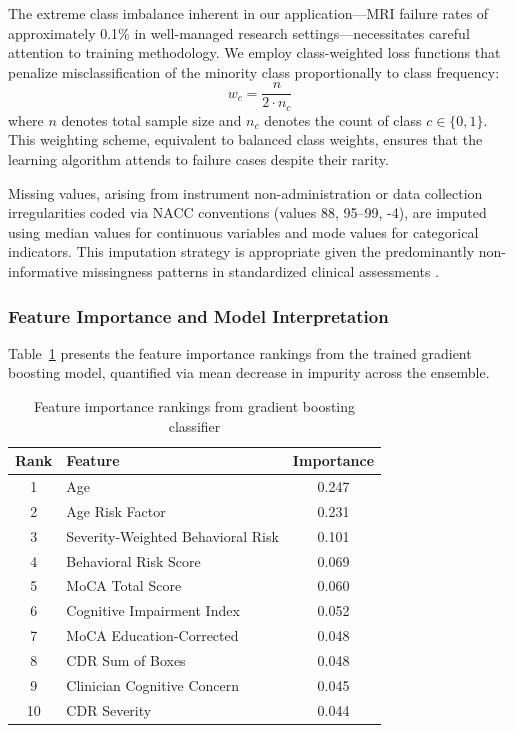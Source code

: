 The extreme class imbalance inherent in our application---MRI failure rates of approximately 0.1\% in well-managed research settings---necessitates careful attention to training methodology. We employ class-weighted loss functions that penalize misclassification of the minority class proportionally to class frequency:
\begin{equation}
w_c = \frac{n}{2 \cdot n_c}
\end{equation}
where $n$ denotes total sample size and $n_c$ denotes the count of class $c \in \{0, 1\}$. This weighting scheme, equivalent to balanced class weights, ensures that the learning algorithm attends to failure cases despite their rarity.

Missing values, arising from instrument non-administration or data collection irregularities coded via NACC conventions (values 88, 95--99, -4), are imputed using median values for continuous variables and mode values for categorical indicators. This imputation strategy is appropriate given the predominantly non-informative missingness patterns in standardized clinical assessments \citep{sterne2009multiple}.

\subsubsection{Feature Importance and Model Interpretation}

Table~\ref{tab:feature_importance} presents the feature importance rankings from the trained gradient boosting model, quantified via mean decrease in impurity across the ensemble.

\begin{table}[htbp]
\centering
\caption{Feature importance rankings from gradient boosting classifier}
\label{tab:feature_importance}
\begin{tabular}{@{}clc@{}}
\toprule
\textbf{Rank} & \textbf{Feature} & \textbf{Importance} \\
\midrule
1 & Age & 0.247 \\
2 & Age Risk Factor & 0.231 \\
3 & Severity-Weighted Behavioral Risk & 0.101 \\
4 & Behavioral Risk Score & 0.069 \\
5 & MoCA Total Score & 0.060 \\
6 & Cognitive Impairment Index & 0.052 \\
7 & MoCA Education-Corrected & 0.048 \\
8 & CDR Sum of Boxes & 0.048 \\
9 & Clinician Cognitive Concern & 0.045 \\
10 & CDR Severity & 0.044 \\
\bottomrule
\end{tabular}
\end{table}

